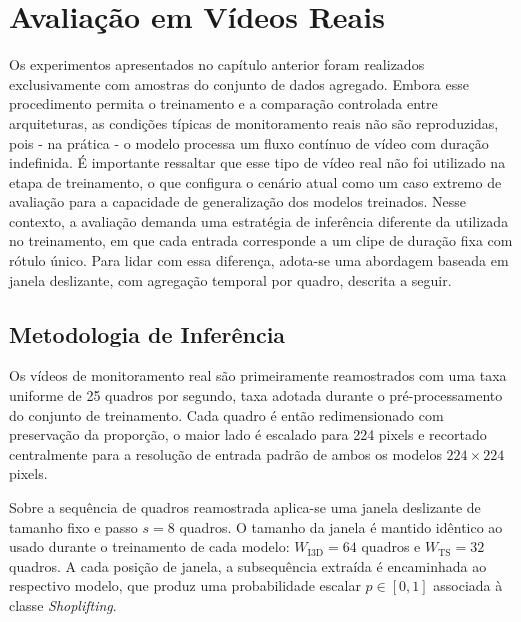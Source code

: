 \documentclass[12pt, %
openright, 
oneside, %
a4paper,    %
brazil]{facom-ufu-abntex2}
\begin{document}

\chapter[Avaliação em Vídeos Reais]{Avaliação em Vídeos Reais}
Os experimentos apresentados no capítulo anterior foram realizados exclusivamente com amostras do conjunto de dados agregado. Embora esse procedimento permita o treinamento e a comparação controlada entre arquiteturas, as condições típicas de monitoramento reais não são reproduzidas, pois - na prática - o modelo processa um fluxo contínuo de vídeo com duração indefinida. É importante ressaltar que esse tipo de vídeo real não foi utilizado na etapa de treinamento, o que configura o cenário atual como um caso extremo de avaliação para a capacidade de generalização dos modelos treinados. Nesse contexto, a avaliação demanda uma estratégia de inferência diferente da utilizada no treinamento, em que cada entrada corresponde a um clipe de duração fixa com rótulo único. Para lidar com essa diferença, adota-se uma abordagem baseada em janela deslizante, com agregação temporal por quadro, descrita a seguir.

\section[Metodologia de Inferência]{Metodologia de Inferência}

Os vídeos de monitoramento real são primeiramente reamostrados com uma taxa uniforme de 25 quadros por segundo, taxa adotada durante o pré-processamento do conjunto de treinamento. Cada quadro é então redimensionado com preservação da proporção, o maior lado é escalado para 224 pixels e recortado centralmente para a resolução de entrada padrão de ambos os modelos $224 \times 224$ pixels.

Sobre a sequência de quadros reamostrada aplica-se uma janela deslizante de tamanho fixo e passo $s = 8$ quadros. O tamanho da janela é mantido idêntico ao usado durante o treinamento de cada modelo: $W_{\text{I3D}} = 64$ quadros e $W_{\text{TS}} = 32$ quadros. A cada posição de janela, a subsequência extraída é encaminhada ao respectivo modelo, que produz uma probabilidade escalar $p \in [0, 1]$ associada à classe \textit{Shoplifting}.
\end{document}
